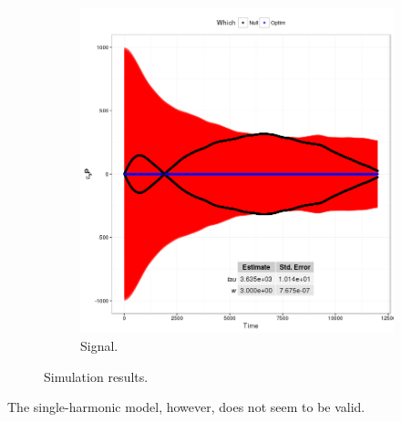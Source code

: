 \documentclass{article}
\begin{document}
\begin{figure}[h]
\begin{subfigure}{.5\textwidth}
		\includegraphics[scale=.5]{img/Signal/FreqCreep_Sgl_plot}
		\caption{Signal.\label{fig:WCreep_Sgl_plot}}
	\end{subfigure}
	\caption{Simulation results.}
\end{figure}

The single-harmonic model, however, does not seem to be valid.
\end{document}
